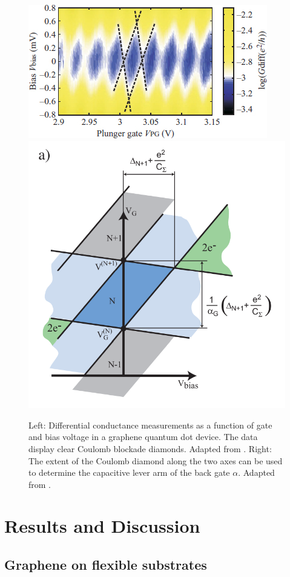 \documentclass[edeposit,fullpage,draftthesis]{uiucthesis2009}
\begin{document}
            \begin{figure}
                \centering
                \includegraphics[width=0.6\linewidth]{images/experimentaltechniques/cb_diamond.jpg}
                \includegraphics[width=0.39\linewidth]{images/experimentaltechniques/cb_slope.png}
                \caption[Coulomb blockade diamonds in graphene]{
                    Left: Differential conductance measurements as a function of gate and bias voltage in a 
                    graphene quantum dot device. The data display clear Coulomb blockade diamonds.
                    Adapted from \cite{guttinger2008coulomb}.
                    Right: The extent of the Coulomb diamond along the two axes can be used to
                    determine the capacitive lever arm of the back gate $\alpha$.
                    Adapted from \cite{cb_lecture07}.
                    }
                \label{fig:cb_diamond}
            \end{figure}
            
            
    
\chapter{Results and Discussion}
\label{sec:ch:rd}

\section{Graphene on flexible substrates}
\label{sec:res:ripping}
\end{document}
